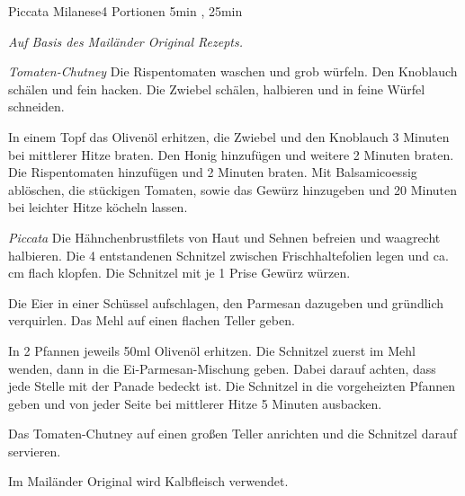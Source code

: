 \documentclass[../recipe-collections/cooking.tex]{subfiles}
\begin{document}
\begin{recipe}{Piccata Milanese}{4 Portionen }{5min , 25min }

  \freeform{}\textit{Auf Basis des Mailänder Original Rezepts.}


  \textit{Tomaten-Chutney}
  Die Rispentomaten waschen und grob würfeln.
  Den Knoblauch schälen und fein hacken.
  Die Zwiebel schälen, halbieren und in feine Würfel schneiden.


  In einem Topf das Olivenöl erhitzen, die Zwiebel und den Knoblauch 3 Minuten bei mittlerer Hitze braten.
  Den Honig hinzufügen und weitere 2 Minuten braten.
  Die Rispentomaten hinzufügen und 2 Minuten braten.
  Mit Balsamicoessig ablöschen, die stückigen Tomaten, sowie das Gewürz hinzugeben und 20 Minuten bei leichter Hitze köcheln lassen.


  \textit{Piccata}
  Die Hähnchenbrustfilets von Haut und Sehnen befreien und waagrecht halbieren.
  Die 4 entstandenen Schnitzel zwischen Frischhaltefolien legen und ca.  cm flach klopfen.
  Die Schnitzel mit je 1 Prise Gewürz würzen.


  Die Eier in einer Schüssel aufschlagen, den Parmesan dazugeben und gründlich verquirlen.
  Das Mehl auf einen flachen Teller geben.


  In 2 Pfannen jeweils 50ml Olivenöl erhitzen.
  Die Schnitzel zuerst im Mehl wenden, dann in die Ei-Parmesan-Mischung geben.
  Dabei darauf achten, dass jede Stelle mit der Panade bedeckt ist.
  Die Schnitzel in die vorgeheizten Pfannen geben und von jeder Seite bei mittlerer Hitze 5 Minuten ausbacken.

  \newstep{}Das Tomaten-Chutney auf einen großen Teller anrichten und die Schnitzel darauf servieren.

  \freeform{}\hrulefill{}

  \freeform{}
  Im Mailänder Original wird Kalbfleisch verwendet.

\end{recipe}
\end{document}
